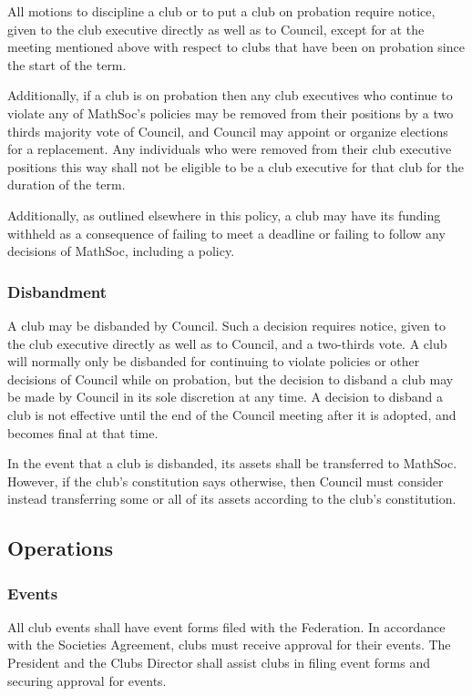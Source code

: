 All motions to discipline a club or to put a club on probation require notice,
given to the club executive directly as well as to Council, except for at the
meeting mentioned above with respect to clubs that have been on probation since
the start of the term.

Additionally, if a club is on probation then any club executives who continue
to violate any of MathSoc's policies may be removed from their positions by a
two thirds majority vote of Council, and Council may appoint or organize
elections for a replacement. Any individuals who were removed from their club
executive positions this way shall not be eligible to be a club executive for
that club for the duration of the term.

Additionally, as outlined elsewhere in this policy, a club may have its funding
withheld as a consequence of failing to meet a deadline or failing to follow any
decisions of MathSoc, including a policy.

\subsubsection{Disbandment}
A club may be disbanded by Council. Such a decision requires notice, given to
the club executive directly as well as to Council, and a two-thirds vote. A club
will normally only be disbanded for continuing to violate policies or other
decisions of Council while on probation, but the decision to disband a club may
be made by Council in its sole discretion at any time. A decision to disband a
club is not effective until the end of the Council meeting after it is adopted,
and becomes final at that time.

In the event that a club is disbanded, its assets shall be transferred to MathSoc.
However, if the club's constitution says otherwise, then Council must consider
instead transferring some or all of its assets according to the club's
constitution.

\subsection{Operations}
\subsubsection{Events}
All club events shall have event forms filed with the Federation. In accordance
with the Societies Agreement, clubs must receive approval for their events.  The
President and the Clubs Director shall assist clubs in filing
event forms and securing approval for events.

